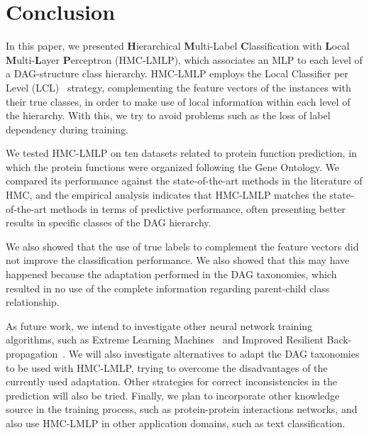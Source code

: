 \section{Conclusion}\label{sec:conclusion}
In this paper, we presented {\bf H}ierarchical {\bf M}ulti-Label {\bf C}lassification with {\bf L}ocal {\bf M}ulti-{\bf L}ayer {\bf P}erceptron (HMC-LMLP), which associates an MLP to each level of a DAG-structure class hierarchy. HMC-LMLP employs the Local Classifier per Level (LCL)~\cite{Silla2010} strategy, complementing the feature vectors of the instances with their true classes, in order to make use of local information within each level of the hierarchy. With this, we try to avoid problems such as the loss of label dependency during training.

We tested HMC-LMLP on ten datasets related to protein function prediction, in which the protein functions were organized following the Gene Ontology. We compared its performance against the state-of-the-art methods in the literature of HMC, and the empirical analysis indicates that HMC-LMLP matches the state-of-the-art methods in terms of predictive performance, often presenting better results in specific classes of the DAG hierarchy.

We also showed that the use of true labels to complement the feature vectors did not improve the classification performance. We also showed that this may have happened because the adaptation performed in the DAG taxonomies, which resulted in no use of the complete information regarding parent-child class relationship.

As future work, we intend to investigate other neural network training algorithms, such as Extreme Learning Machines~\cite{Huang2004} and Improved Resilient Back-propagation~\cite{Igel2000}. We will also investigate alternatives to adapt the DAG taxonomies to be used with HMC-LMLP, trying to overcome the disadvantages of the currently used adaptation. Other strategies for correct inconsistencies in the prediction will also be tried. Finally, we plan to incorporate other knowledge source in the training process, such as protein-protein interactions networks, and also use HMC-LMLP in other application domains, such as text classification.
